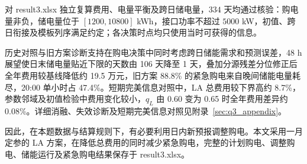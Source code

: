 对 result3.xlsx 独立复算费用、电量平衡及跨日储电量，$334$ 天均通过核验：购电量非负，储电量位于 $[1200,10800]$ kWh，接口功率不超过 $5000$ kW，初值、跨日衔接及模板列序满足约定；各决策时点均只使用当时可获得的信息。

历史对照与旧方案诊断支持在购电决策中同时考虑跨日储能需求和预测误差，48 h 展望使日末储电量贴近下限的天数由 106 天降至 1 天，叠加分源残差分位修正后全年费用较基线降低约 19.5 万元，旧方案 88.8\% 的紧急购电来自晚间储能电量耗尽，20:00 单小时占 47.4\%。短期完美信息对照中，LA 总费用较下界高约 8.7\%，参数邻域及初值检验中费用变化较小，$q_L$ 由 0.60 变为 0.65 时全年费用差异约 0.08\%。详细消融、失效诊断及短期完美信息对照见附录~\ref{sec:q3_appendix}。

因此，在本题数据与结算规则下，有必要利用日内新预报调整购电。本文采用一月定参的 LA 方案，在降低总费用的同时减少紧急购电，完整的计划购电、调整购电、储能运行及紧急购电结果保存于 result3.xlsx。
